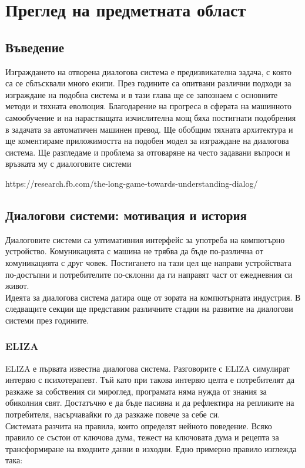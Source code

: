 \chapter{Преглед на предметната област} %

\label{Chapter2} 


\section{Въведение}
Изграждането на отворена диалогова система е предизвикателна задача, с която са се сблъсквали много екипи. През годините са опитвани различни подходи за изграждане на подобна система и в тази глава ще се запознаем с основните методи и тяхната еволюция. 
Благодарение на прогреса в сферата на машинното самообучение и на нарастващата изчислителна мощ бяха постигнати подобрения в задачата за автоматичен машинен превод. Ще обобщим тяхната архитектура и ще коментираме приложимостта на подобен модел за изграждане на диалогова система.
Ще разгледаме и проблема за отговаряне на често задавани въпроси и връзката му с диалоговите системи


https://research.fb.com/the-long-game-towards-understanding-dialog/

\section{Диалогови системи: мотивация и история}

Диалоговите системи са ултимативния интерфейс за употреба на компютърно устройство. Комуникацията с машина не трябва да бъде по-различна от комуникацията с друг човек. Постигането на тази цел ще направи устройствата по-достъпни и потребителите по-склонни да ги направят част от ежедневния си живот. \\
Идеята за диалогова система датира още от зората на компютърната индустрия. В следващите секции ще представим различните стадии на развитие на диалогови системи през годините.

\subsection{ELIZA}
ELIZA \cite{eliza} е първата известна диалогова система. Разговорите с ELIZA симулират интервю с психотерапевт. Тъй като при такова интервю целта е потребителят да разкаже за собствения си мироглед, програмата няма нужда от знания за обиколния свят. Достатъчно е да бъде пасивна и да рефлектира на репликите на потребителя, насърчавайки го да разкаже повече за себе си. \\ Системата разчита на правила, които определят нейното поведение. Всяко правило се състои от ключова дума, тежест на ключовата дума и рецепта за трансформиране на входните данни в изходни. Едно примерно правило изглежда така:

